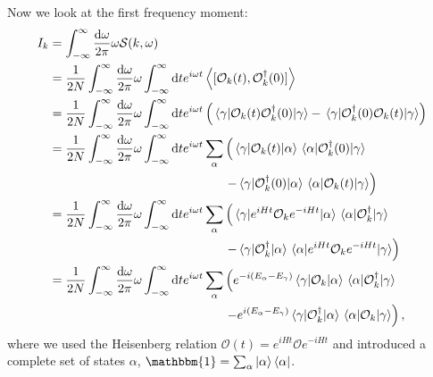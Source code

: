 \documentclass[11pt, a4paper]{report} %
\begin{document}
Now we look at the first frequency moment:
\begin{align}
  I_k &= \int_{-\infty}^{\infty}\frac{\dd \omega}{2\pi} \omega \mathcal{S}(k,\omega)\\
  &= \frac{1}{2N} \int_{-\infty}^{\infty}\frac{\dd \omega}{2\pi} \omega \int_{-\infty}^{\infty} \dd t e^{i\omega t} \expval{[\mathcal{O}_k(t),\mathcal{O}_{k}^{\dagger}(0)]}\\
&= \frac{1}{2N} \int_{-\infty}^{\infty}\frac{\dd \omega}{2\pi} \omega \int_{-\infty}^{\infty} \dd t e^{i\omega t} \left(\matrixel{\gamma}{\mathcal{O}_k(t)\mathcal{O}_{k}^{\dagger}(0)}{\gamma} - \matrixel{\gamma}{\mathcal{O}_{k}^{\dagger}(0)\mathcal{O}_k(t)}{\gamma}\right) \\
&= \frac{1}{2N} \int_{-\infty}^{\infty}\frac{\dd \omega}{2\pi} \omega \int_{-\infty}^{\infty} \dd t e^{i\omega t} \sum_{\alpha} \left(\matrixel{\gamma}{\mathcal{O}_k(t)}{\alpha}\matrixel{\alpha}{\mathcal{O}_{k}^{\dagger}(0)}{\gamma} \right.\nonumber\\
&\qquad\qquad\qquad\qquad\qquad\qquad\qquad\left.- \matrixel{\gamma}{\mathcal{O}_{k}^{\dagger}(0)}{\alpha}\matrixel{\alpha}{\mathcal{O}_k(t)}{\gamma}\right)\\
&= \frac{1}{2N} \int_{-\infty}^{\infty}\frac{\dd \omega}{2\pi} \omega \int_{-\infty}^{\infty} \dd t e^{i\omega t} \sum_{\alpha} \left(\matrixel{\gamma}{e^{iHt}\mathcal{O}_ke^{-iHt}}{\alpha}\matrixel{\alpha}{\mathcal{O}_{k}^{\dagger}}{\gamma} \right.\nonumber\\
&\qquad\qquad\qquad\qquad\qquad\qquad\qquad\left.- \matrixel{\gamma}{\mathcal{O}_{k}^{\dagger}}{\alpha}\matrixel{\alpha}{e^{iHt}\mathcal{O}_ke^{-iHt}}{\gamma}\right)\\
&= \frac{1}{2N} \int_{-\infty}^{\infty}\frac{\dd \omega}{2\pi} \omega \int_{-\infty}^{\infty} \dd t e^{i\omega t} \sum_{\alpha} \left(e^{-i(E_{\alpha}-E_{\gamma})}\matrixel{\gamma}{\mathcal{O}_k}{\alpha}\matrixel{\alpha}{\mathcal{O}_{k}^{\dagger}}{\gamma} \right.\nonumber\\ 
&\qquad\qquad\qquad\qquad\qquad\qquad\qquad\left.- e^{i(E_{\alpha}-E_{\gamma})}\matrixel{\gamma}{\mathcal{O}_{k}^{\dagger}}{\alpha}\matrixel{\alpha}{\mathcal{O}_k}{\gamma}\right), \label{eq:fourierfreqmoment}
\end{align}
where we used the Heisenberg relation \(\mathcal{O}(t) = e^{iHt}\mathcal{O}e^{-iHt}\) and introduced a complete set of states \(\alpha\), \(\mathbbm{1}=\sum_{\alpha}\ket{\alpha}\bra{\alpha}\).
\end{document}
